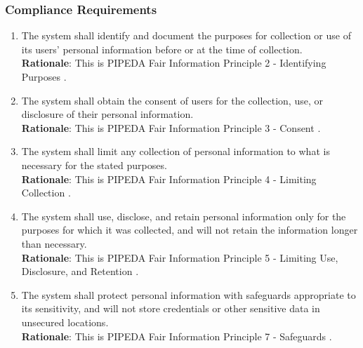 \documentclass[]{article}
\begin{document}
\subsubsection{Compliance Requirements}
\label{ssub:compliance_requirements}
\begin{enumerate}[{LR-COMP}1. ]
    \item The system shall identify and document the purposes for collection or use of its users' personal information before or at the time of collection. \\
    \textbf{Rationale}: This is PIPEDA Fair Information Principle 2 - Identifying Purposes \cite{pipedaAll}.

    \item The system shall obtain the consent of users for the collection, use, or disclosure of their personal information. \\
    \textbf{Rationale}: This is PIPEDA Fair Information Principle 3 - Consent \cite{pipedaAll}.

    \item The system shall limit any collection of personal information to what is necessary for the stated purposes. \\
    \textbf{Rationale}: This is PIPEDA Fair Information Principle 4 - Limiting Collection \cite{pipedaAll}.

    \item The system shall use, disclose, and retain personal information only for the purposes for which it was collected, and will not retain the information longer than necessary. \\
    \textbf{Rationale}: This is PIPEDA Fair Information Principle 5 - Limiting Use, Disclosure, and Retention \cite{pipedaAll}.

    \item The system shall protect personal information with safeguards appropriate to its sensitivity, and will not store credentials or other sensitive data in unsecured locations. \\
    \textbf{Rationale}: This is PIPEDA Fair Information Principle 7 - Safeguards \cite{pipedaAll}.
\end{enumerate}
\end{document}
